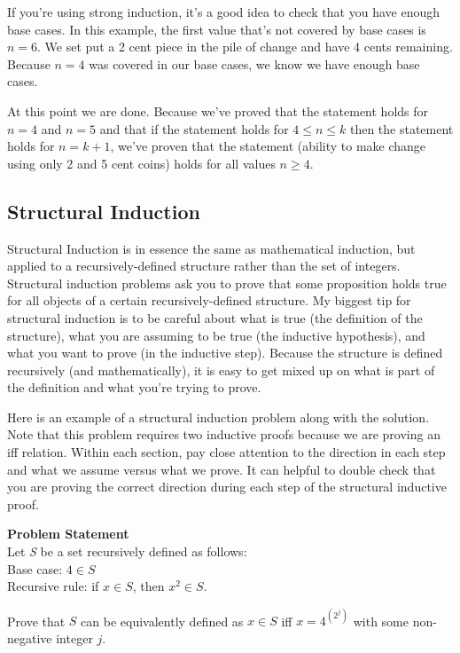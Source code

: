\documentclass{article}
\theoremstyle{definition}
\begin{document}
If you're using strong induction, it's a good idea to check that you have enough base cases. In this example, the first value that's not covered by base cases is $n=6$. We set put a 2 cent piece in the pile of change and have 4 cents remaining. Because $n=4$ was covered in our base cases, we know we have enough base cases.

At this point we are done. Because we've proved that the statement holds for $n=4$ and $n=5$ and that if the statement holds for $4 \leq n \leq k$ then the statement holds for $n=k+1$, we've proven that the statement (ability to make change using only 2 and 5 cent coins) holds for all values $n \geq 4$. 

\subsection*{Structural Induction}
Structural Induction is in essence the same as mathematical induction, but applied to a recursively-defined structure rather than the set of integers. Structural induction problems ask you to prove that some proposition holds true for all objects  of a certain recursively-defined structure. My biggest tip for structural induction is to be careful about what is true (the definition of the structure), what you are assuming to be true (the inductive hypothesis), and what you want to prove (in the inductive step). Because the structure is defined recursively (and mathematically), it is easy to get mixed up on what is part of the definition and what you're trying to prove. 

Here is an example of a structural induction problem along with the solution. Note that this problem requires two inductive proofs because we are proving an iff relation. Within each section, pay close attention to the direction in each step and what we assume versus what we prove. It can helpful to double check that you are proving the correct direction during each step of the structural inductive proof.

\textbf{Problem Statement} \\
Let \textit{S} be a set recursively defined as follows: \\
Base case: $4 \in S$ \\
Recursive rule: if $x \in S$, then $x^2 \in S$.

Prove that $S$ can be equivalently defined as $x \in S$ iff $x = 4^{(2^j)}$ with some non-negative integer $j$.
\end{document}
